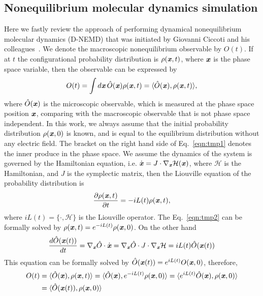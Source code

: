 \documentclass[aip,jcp,a4paper,preprint,onecolumn]{revtex4-1}
\newcommand{\vect}[1]{\textbf{\textit{#1}}}
\begin{document}
\subsection{Nonequilibrium molecular dynamics simulation}
Here we fastly review the approach of performing dynamical nonequilibrium
molecular dynamics (D-NEMD) that was initiated by Giovanni Ciccoti and his
colleagues~\cite{ciccotti1975direct, ciccotti1979thought,
  orlandini2011hydrodynamics, orlandini2011hydrodynamics-01}.
We denote the macroscopic nonequilibrium observable by $O(t)$. If at $t$
the configurational probability distribution is $\rho(\vect x, t)$, where
$\vect x$ is the phase space variable, then the observable can be
expressed by
\begin{align}\label{eqn:tmp1}
  O(t) = \int d\vect x\, \hat O(\vect x)\rho(\vect x, t)  = \langle \hat O(\vect x), \rho(\vect x, t)\rangle,
\end{align}
where $\hat O (\vect x)$ is the microscopic observable, 
which is measured at the phase space position $\vect x$,
comparing with the macroscopic observable that is not phase space independent.
In this work, we always assume that the initial probability distribution
$\rho(\vect x, 0)$ is known, and is equal to the equilibrium distribution
without any electric field.
The bracket on the right hand side of Eq.~\eqref{eqn:tmp1} denotes the inner produce in the
phase space.  We assume the dynamics of the system is governed by the
Hamiltonian equation, i.e. $\dot {\vect x} = J \cdot \nabla_{\vect x}
\mathcal H(\vect x)$, where $\mathcal H$ is the Hamiltonian, and $J$ is
the symplectic matrix, then the Liouville equation of the probability
distribution is
\begin{align}\label{eqn:tmp2}
  \frac{\partial \rho(\vect x, t)}{\partial t} = - iL(t) \rho(\vect x, t),
\end{align}
where $iL(t) = \{\cdot, \mathcal H\}$ is the Liouville operator.
The Eq.~\eqref{eqn:tmp2}
can be formally solved by $\rho(\vect x, t) = e^{-iL(t)} \rho(\vect x, 0)$.
On the other hand
\begin{align}
  \frac{d \hat O(\vect x(t))}{dt} = \nabla_{\vect x}\hat O\cdot \dot{\vect x}
  = \nabla_{\vect x}\hat O\cdot J\cdot \nabla_{\vect x}\mathcal H
  = iL(t) \hat O (\vect x(t))
\end{align}
This equation can be formally solved by $\hat O(\vect x(t)) = e^{iL(t)} O(\vect x, 0)$, therefore,
\begin{align}\nonumber
  O(t) & = \langle \hat O(\vect x), \rho(\vect x, t)\rangle
  = \langle \hat O(\vect x), e^{-iL(t)} \rho(\vect x, 0)\rangle
  = \langle e^{iL(t)}\hat O(\vect x), \rho(\vect x, 0)\rangle\\\label{eqn:tmp4}
  &= \langle \hat O(\vect x(t)), \rho(\vect x, 0)\rangle
\end{align}
\end{document}
